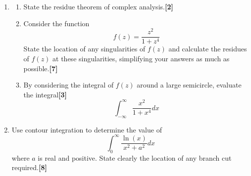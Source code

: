 \documentclass[a4paper]{article}
\begin{document}
\newpage
\begin{qns}\leavevmode
\begin{enumerate}[label=(\alph*)]
\item
\begin{enumerate}[label=(\roman*)]
\item State the residue theorem of complex analysis.\hfill\textbf{[2]}
\item Consider the function
$$f(z)=\frac{z^2}{1+z^4}$$
State the location of any singularities of $f(z)$ and calculate the residues of $f(z)$ at these singularities, simplifying your answers as much as possible.\hfill\textbf{[7]}
\item By considering the integral of $f(z)$ around a large semicircle, evaluate the integral\hfill\textbf{[3]}
$$\int_{-\infty}^\infty\frac{x^2}{1+x^4}dx$$
\end{enumerate}
\item Use contour integration to determine the value of
$$\int_0^\infty\frac{\ln(x)}{x^2+a^2}dx$$
where $a$ is real and positive. State clearly the location of any branch cut required.\hfill\textbf{[8]}
\end{enumerate}
\end{qns}
\end{document}
